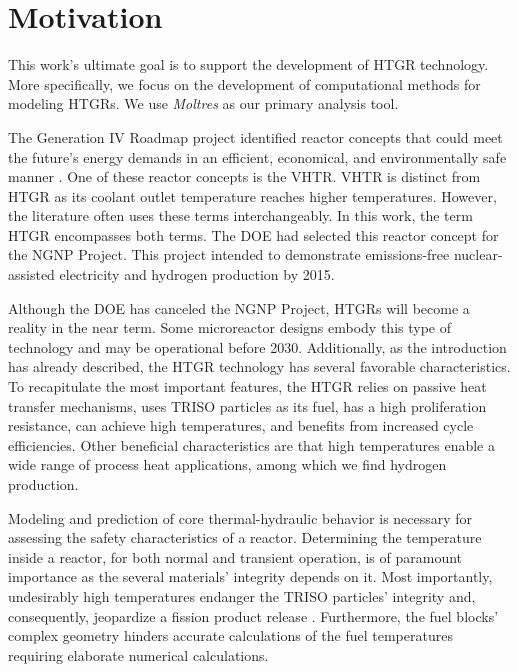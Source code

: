 \section{Motivation}


This work's ultimate goal is to support the development of \gls{HTGR} technology.
More specifically, we focus on the development of computational methods for modeling \glspl{HTGR}.
We use \textit{Moltres} as our primary analysis tool.

The Generation IV Roadmap project identified reactor concepts that could meet the future's energy demands in an efficient, economical, and environmentally safe manner \cite{macdonald_ngnp_2003}.
One of these reactor concepts is the \gls{VHTR}.
\gls{VHTR} is distinct from \gls{HTGR} as its coolant outlet temperature reaches higher temperatures.
However, the literature often uses these terms interchangeably.
In this work, the term \gls{HTGR} encompasses both terms.
The \gls{DOE} had selected this reactor concept for the \gls{NGNP} Project.
This project intended to demonstrate emissions-free nuclear-assisted electricity and hydrogen production by 2015.

Although the \gls{DOE} has canceled the \gls{NGNP} Project, \glspl{HTGR} will become a reality in the near term.
Some microreactor designs embody this type of technology and may be operational before 2030.
Additionally, as the introduction has already described, the \gls{HTGR} technology has several favorable characteristics.
To recapitulate the most important features, the \gls{HTGR} relies on passive heat transfer mechanisms, uses TRISO particles as its fuel, has a high proliferation resistance, can achieve high temperatures, and benefits from increased cycle efficiencies.
Other beneficial characteristics are that high temperatures enable a wide range of process heat applications, among which we find hydrogen production.

Modeling and prediction of core thermal-hydraulic behavior is necessary for assessing the safety characteristics of a reactor.
Determining the temperature inside a reactor, for both normal and transient operation, is of paramount importance as the several materials' integrity depends on it.
Most importantly, undesirably high temperatures endanger the TRISO particles' integrity and, consequently, jeopardize a fission product release \cite{tak_numerical_2008}.
Furthermore, the fuel blocks' complex geometry hinders accurate calculations of the fuel temperatures requiring elaborate numerical calculations.

